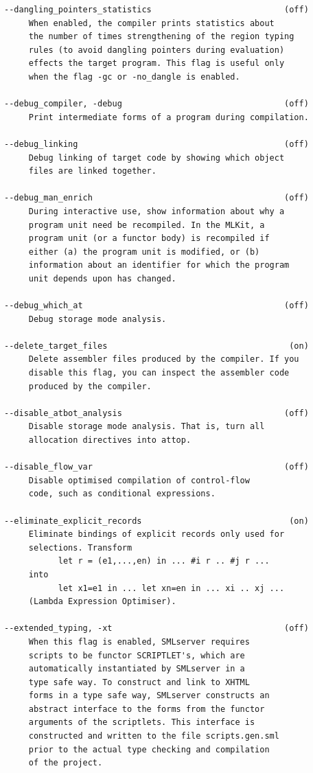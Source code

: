 \documentclass[12pt]{book}
\begin{document}
\begin{verbatim}
--dangling_pointers_statistics                           (off)
     When enabled, the compiler prints statistics about
     the number of times strengthening of the region typing
     rules (to avoid dangling pointers during evaluation)
     effects the target program. This flag is useful only
     when the flag -gc or -no_dangle is enabled.

--debug_compiler, -debug                                 (off)
     Print intermediate forms of a program during compilation.

--debug_linking                                          (off)
     Debug linking of target code by showing which object
     files are linked together.

--debug_man_enrich                                       (off)
     During interactive use, show information about why a
     program unit need be recompiled. In the MLKit, a
     program unit (or a functor body) is recompiled if
     either (a) the program unit is modified, or (b)
     information about an identifier for which the program
     unit depends upon has changed.

--debug_which_at                                         (off)
     Debug storage mode analysis.

--delete_target_files                                     (on)
     Delete assembler files produced by the compiler. If you
     disable this flag, you can inspect the assembler code
     produced by the compiler.

--disable_atbot_analysis                                 (off)
     Disable storage mode analysis. That is, turn all
     allocation directives into attop.

--disable_flow_var                                       (off)
     Disable optimised compilation of control-flow
     code, such as conditional expressions.

--eliminate_explicit_records                              (on)
     Eliminate bindings of explicit records only used for
     selections. Transform
           let r = (e1,...,en) in ... #i r .. #j r ...
     into
           let x1=e1 in ... let xn=en in ... xi .. xj ...
     (Lambda Expression Optimiser).

--extended_typing, -xt                                   (off)
     When this flag is enabled, SMLserver requires
     scripts to be functor SCRIPTLET's, which are
     automatically instantiated by SMLserver in a
     type safe way. To construct and link to XHTML
     forms in a type safe way, SMLserver constructs an
     abstract interface to the forms from the functor
     arguments of the scriptlets. This interface is
     constructed and written to the file scripts.gen.sml
     prior to the actual type checking and compilation
     of the project.


\end{verbatim}
\end{document}
